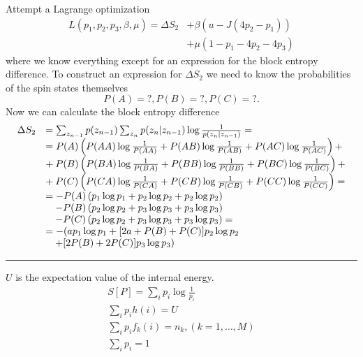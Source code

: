 \documentclass[a4paper, 12pt]{article}
\begin{document}
Attempt a Lagrange optimization
\begin{equation}
    \begin{split}
        L(p_1, p_2, p_3, \beta, \mu) = \Delta S_2 & + \beta ( u - J(4p_2 - p_1))  \\
        & + \mu ( 1 - p_1 - 4 p_2 - 4 p_3 )
    \end{split}
\end{equation}
where we know everything except for an expression for the block entropy difference. To construct an expression for $\Delta S_2$ we need to know the probabilities of the spin states themselves
\begin{equation}
    P(A) = ?, P(B) = ?, P(C) = ?.
\end{equation}
Now we can calculate the block entropy difference
\begin{equation}
    \begin{array}{ll}
        \Delta S_2 & = \sum_{z_{n-1}} p(z_{n-1}) \sum_{z_n} p(z_n|z_{n-1}) \log \frac{1}{p(z_n|z_{n-1})} = \\
        & = P(A) \left(P(AA) \log \frac{1}{P(AA)} + P(AB) \log \frac{1}{P(AB)} +P(AC) \log \frac{1}{P(AC)} \right) + \\
        & + \hspace{.23em} P(B) \left(P(BA) \log \frac{1}{P(BA)} + P(BB) \log \frac{1}{P(BB)} +P(BC) \log \frac{1}{P(BC)} \right) +  \\
        & + \hspace{.23em} P(C) \left(P(CA) \log \frac{1}{P(CA)} + P(CB) \log \frac{1}{P(CB)} +P(CC) \log \frac{1}{P(CC)} \right) = \\
        & = - P(A) \left( p_1 \log p_1 + p_2 \log p_2 + p_2 \log p_2  \right) \\
        & \hspace{1em} - P(B)  \left( p_2 \log p_2 + p_3 \log p_3 + p_3 \log p_3  \right) \\
        & \hspace{1em} - P(C)  \left( p_2 \log p_2 + p_3 \log p_3 + p_3 \log p_3  \right) = \\
        & = - ( a p_1 \log p_1 + [2a + P(B) + P(C)] p_2 \log p_2  \\
        & \hspace{1em} + [2P(B) + 2P(C)] p_3 \log p_3 )
    \end{array}
\end{equation}


\noindent\rule{\textwidth}{0.4pt}

$U$ is the expectation value of the internal energy.
\begin{gather}
    S[P] = \sum_i p_i \log \frac{1}{p_i} \\
    \sum_i p_i h(i) = U \\
    \sum_i p_i f_k(i) = n_k, (k = 1, \dots , M) \\
    \sum_i p_i = 1
\end{gather}
\end{document}
